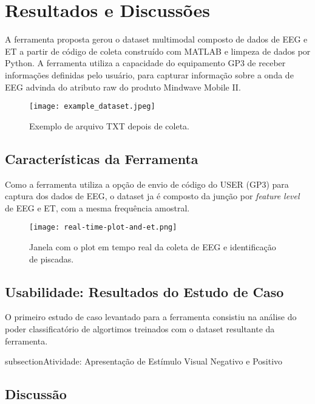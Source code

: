 \chapter{Resultados e Discussões}

A ferramenta proposta gerou o dataset multimodal composto de dados de EEG e ET a partir de código 
de coleta construído com MATLAB e limpeza de dados por Python. A ferramenta utiliza a capacidade do 
equipamento GP3 de receber informações definidas pelo usuário, para capturar informação sobre a onda de EEG advinda 
do atributo raw do produto Mindwave Mobile II. 

\begin{figure}[!h]
    \centering
    \texttt{[image: example\_dataset.jpeg]}
    \caption{Exemplo de arquivo TXT depois de coleta.}
\end{figure}

\section{Características da Ferramenta}
Como a ferramenta utiliza a opção de envio de código do USER (GP3) para captura dos dados de EEG, 
o dataset ja é composto da junção por \textit{feature level} de EEG e ET, com a mesma frequência amostral. 

\begin{figure}[!h]
    \centering
    \texttt{[image: real-time-plot-and-et.png]}
    \caption{Janela com o plot em tempo real da coleta de EEG e identificação de piscadas.}
\end{figure}

\clearpage

\section{Usabilidade: Resultados do Estudo de Caso}
O primeiro estudo de caso levantado para a ferramenta consistiu na análise do poder classificatório de algortimos 
treinados com o dataset resultante da ferramenta. 

subsection{Atividade: Apresentação de Estímulo Visual Negativo e Positivo}

\section{Discussão}